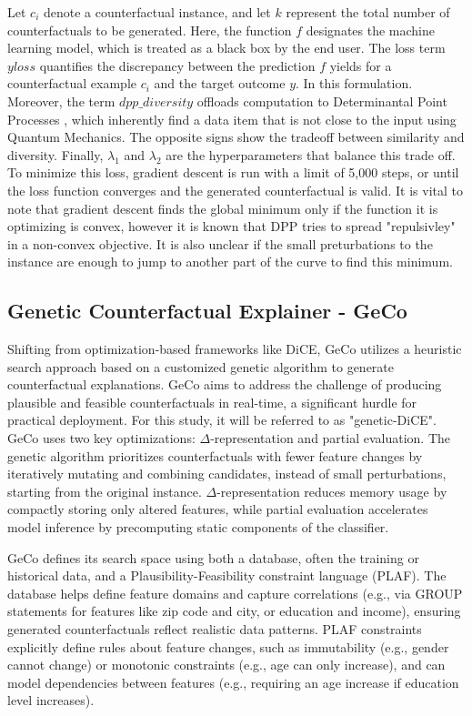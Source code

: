 Let $c_i$ denote a counterfactual instance, and let $k$ represent the total number of counterfactuals to be generated. Here, the function $f$ designates the machine learning model, which is treated as a black box by the end user. The loss term $yloss$ quantifies the discrepancy between the prediction $f$ yields for a counterfactual example $c_i$ and the target outcome $y$. In this formulation. Moreover, the term $dpp\_diversity$ offloads computation to Determinantal Point Processes \citep{kulesza2012determinantal}, which inherently find a data item that is not close to the input using Quantum Mechanics. The opposite signs show the tradeoff between similarity and diversity.  Finally, $\lambda_1$ and $\lambda_2$ are the hyperparameters that balance this trade off. To minimize this loss, gradient descent is run with a limit of 5,000 steps, or until the loss function converges and the generated counterfactual is valid. It is vital to note that gradient descent finds the global minimum only if the function it is optimizing is convex, however it is known that DPP tries to spread "repulsivley" in a non-convex objective. It is also unclear if the small preturbations to the instance are enough to jump to another part of the curve to find this minimum.

\subsection{Genetic Counterfactual Explainer - GeCo}
Shifting from optimization-based frameworks like DiCE, GeCo \citep{schleich2021geco} utilizes a heuristic search approach based on a customized genetic algorithm to generate counterfactual explanations. GeCo aims to address the challenge of producing plausible and feasible counterfactuals in real-time, a significant hurdle for practical deployment. For this study, it will be referred to as "genetic-DiCE". GeCo uses two key optimizations: $\Delta$-representation and partial evaluation. The genetic algorithm prioritizes counterfactuals with fewer feature changes by iteratively mutating and combining candidates, instead of small perturbations, starting from the original instance. $\Delta$-representation reduces memory usage by compactly storing only altered features, while partial evaluation accelerates model inference by precomputing static components of the classifier.

GeCo defines its search space using both a database, often the training or historical data, and a Plausibility-Feasibility constraint language (PLAF). The database helps define feature domains and capture correlations (e.g., via GROUP statements for features like zip code and city, or education and income), ensuring generated counterfactuals reflect realistic data patterns. PLAF constraints explicitly define rules about feature changes, such as immutability (e.g., gender cannot change) or monotonic constraints (e.g., age can only increase), and can model dependencies between features (e.g., requiring an age increase if education level increases).

